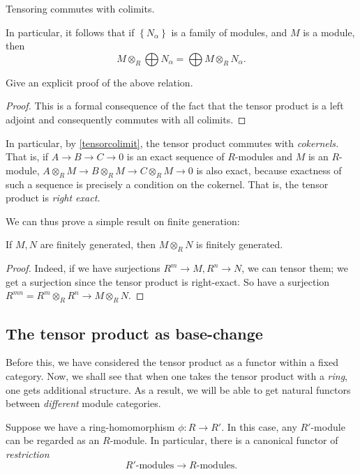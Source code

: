 \begin{proposition} \label{tensorcolimit}
Tensoring commutes with colimits. 
\end{proposition}

In particular, it follows that if $\left\{N_\alpha\right\}$ is a family of
modules, and $M$ is a module, then
\[ M \otimes_R \bigoplus N_\alpha = \bigoplus M \otimes_R N_\alpha.  \]
\begin{exercise}
Give an explicit proof of the above relation.
\end{exercise}

\begin{proof}
This is a formal consequence of the fact that the tensor product is a left
adjoint and consequently commutes with all colimits.
\end{proof}

In particular,  by \cref{tensorcolimit}, the tensor product commutes with \emph{cokernels.}
That is, if $A \to B \to C \to 0$ is an exact sequence of $R$-modules and $M$
is an $R$-module, $A \otimes_R M \to B \otimes_R M \to C \otimes_R M \to 0$ is
also exact, because exactness of such a sequence is precisely a condition on
the cokernel.
That is, the tensor product is \emph{right exact.}

We can thus prove a simple result on finite generation:
\begin{proposition} \label{fingentensor}
If $M, N$ are finitely generated, then $M \otimes_R N$ is finitely generated.
\end{proposition}
\begin{proof}
Indeed, if we have surjections $R^m \to M, R^n \to N$, we can tensor them; we
get a surjection since the tensor product is right-exact.
So have a surjection
$R^{m n} = R^m \otimes_R R^n \to M \otimes_R N$.
\end{proof}


\subsection{The tensor product as base-change}

Before this, we have considered the tensor product as a functor within a
fixed category. Now, we shall see that when one takes the tensor product with a
\emph{ring}, one gets additional structure. As a result, we will be able to
get natural functors between  \emph{different} module categories.

Suppose we have a
ring-homomorphism $\phi:R \to R'$.  In this case, any $R'$-module can be
regarded as
an $R$-module.
In particular, there is a canonical functor of \emph{restriction}
\[ R'\mbox{-}\mathrm{modules} \to R\mbox{-}\mathrm{modules}.  \]

